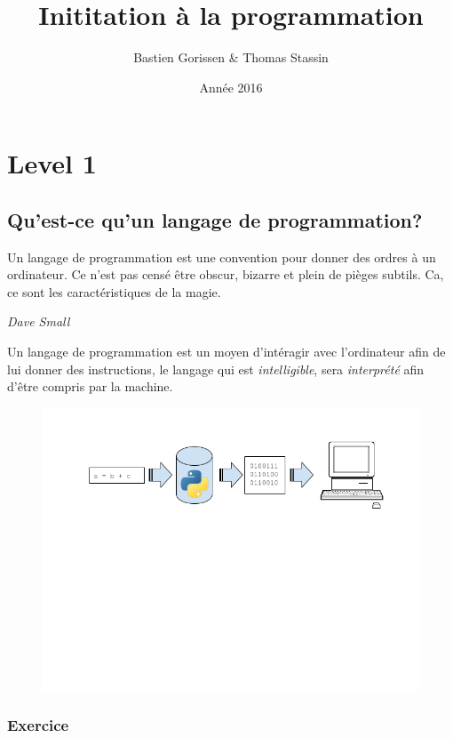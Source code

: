 \documentclass[12pt,a4paper]{book}
\begin{document}
\title{{\huge Inititation à la programmation}}
\author{Bastien Gorissen \& Thomas Stassin}
\date{Année 2016}

\maketitle

\chapter{Level 1}


\section{Qu’est-ce qu’un langage de programmation?}

\epigraph{Un langage de programmation est une convention pour donner des ordres à un ordinateur. Ce n’est pas censé être obscur, bizarre et plein de pièges subtils.
Ca, ce sont les caractéristiques de la magie.}{\textit{Dave Small}}

Un langage de programmation est un moyen d’intéragir avec l’ordinateur afin de lui donner des instructions, le langage qui est \emph{intelligible}, 
sera \emph{interprété} afin d’être compris par la machine.

\begin{figure}[ht]
\centering
\includegraphics[scale=0.5]{translate_code.png} 
\end{figure}

\subsection{Exercice}
 
\end{document}
